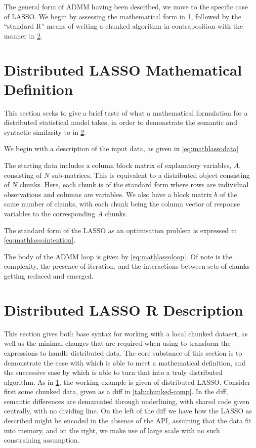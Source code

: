 The general form of ADMM having been described, we move to the specific case of LASSO.
We begin by assessing the mathematical form in \cref{sec:mathlasso}, followed by the ``standard R'' means of writing a chunked algorithm in contraposition with the \lsr{} manner in \cref{sec:rlasso}.

\section{Distributed LASSO Mathematical Definition}\label{sec:mathlasso}

This section seeks to give a brief taste of what a mathematical formulation for a distributed statistical model takes, in order to demonstrate the semantic and syntactic similarity to \lsr{} in \cref{sec:rlasso}.

We begin with a description of the input data, as given in \cref{eq:mathlassodata}


The starting data includes a column block matrix of explanatory variables, $A$, consisting of $N$ sub-matrices.
This is equivalent to a distributed object consisting of $N$ chunks.
Here, each chunk is of the standard form where rows are individual observations and columns are variables.
We also have a block matrix $b$ of the same number of chunks, with each chunk being the column vector of response variables to the corresponding $A$ chunks.

The standard form of the LASSO as an optimisation problem is expressed in \cref{eq:mathlassointention}.


The body of the ADMM loop is given by \cref{eq:mathlassoloop}.
Of note is the complexity, the presence of iteration, and the interactions between sets of chunks getting reduced and emerged.


\section{Distributed LASSO R Description}\label{sec:rlasso}

This section gives both base \R{} syntax for working with a local chunked dataset, as well as the minimal changes that are required when using \lsr{} to transform the expressions to handle distributed data.
The core substance of this section is to demonstrate the ease with which \R{} is able to meet a mathematical definition, and the successive ease by which \lsr{} is able to turn that into a truly distributed algorithm.
As in \cref{sec:mathlasso}, the working example is given of distributed LASSO.
Consider first some chunked data, given as a diff in \cref{tab:chunked-comp}.
In the diff, semantic differences are demarcated through underlining, with shared code given centrally, with no dividing line.
On the left of the diff we have how the LASSO as described might be encoded in the absence of the API, assuming that the data fit into memory, and on the right, we make use of large scale \R{} with no such constraining assumption.

